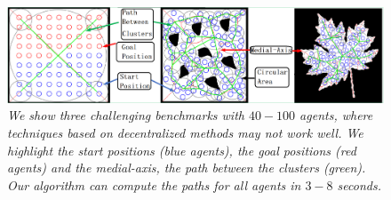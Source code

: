   
 
%
\begin{figure}[!ht]
\centering
\includegraphics[width=\linewidth]{figs/Benchmarks/benchmark.png}
\caption{\em We show three challenging benchmarks with $40-100$ agents, where techniques based on decentralized methods may not work well. We highlight the start positions (blue agents), the goal positions (red agents) and the medial-axis, the path between the clusters (green). Our algorithm can compute the paths for all agents in $3-8$ seconds.}
\vspace*{-0.3in}
\label{fig:benchmarks}
\end{figure}




